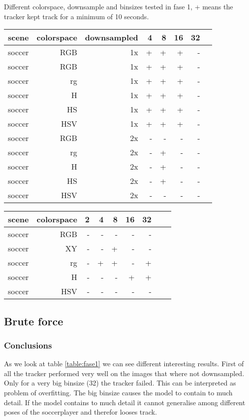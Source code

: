 \documentclass[a4paper,11pt]{article}
\begin{document}
	Different colorspace, downsample and binsizes tested in fase 1, +
	means the tracker kept track for a minimum of 10 seconds. 
	\begin{tabular}{l*{7}{r|}}
		\label{table:fase1}
		scene	& 	colorspace	& downsampled & 4 & 8 & 16 & 32\\
		\hline
		soccer 	& 	RGB	 		& 1x		  			  & + & + & +  &  -\\
		soccer 	& 	RGB	 		& 1x		  			  & + & + & +  &  -\\
		soccer 	& 	rg	 		& 1x 		  			  & + & + & +  &  -\\
		soccer 	& 	H	 		& 1x		 			  & + & + & +  &  -\\
		soccer 	& 	HS	 		& 1x		  			  & + & + & +  &  -\\
		soccer 	& 	HSV	 		& 1x		  			  & + & + & +  &  -\\
		soccer 	& 	RGB	 		& 2x		  			  & - & - & -  &  -\\
		soccer 	& 	rg	 		& 2x 		  			  & - & + & -  &  -\\
		soccer 	& 	H	 		& 2x		  			  & - & + & -  &  -\\
		soccer 	& 	HS	 		& 2x		  			  & - & + & -  &  -\\
		soccer 	& 	HSV	 		& 2x		  			  & - & - & -  &  -\\

	\end{tabular}	

	\begin{tabular}{l*{8}{r|}}
		scene	& 	colorspace	&  2 & 4 & 8 & 16 & 32\\
		\hline
		soccer 	& 	RGB	 		&  - & - & - & - & -\\
		soccer 	& 	XY	 		&  - & - & + & - & -\\
		soccer 	& 	rg	 		&  - & + & + & - & +\\
		soccer 	& 	H	 		&  - & - & - & + & +\\
		soccer 	& 	HSV	 		&  - & - & - & - & -\\ 
	\end{tabular}	

	\subsection{Brute force} 
\subsubsection{Conclusions}
As we look at table \ref{table:fase1} we can see different interesting results.
First of all the tracker performed very well on the images that where not
downsampled. Only for a very big binsize (32) the tracker failed. This can be
interpreted as problem of overfitting. The big binsize causes the model to
contain to much detail. If the model contains to much detail it cannot
generalise among different poses of the soccerplayer and therefor looses track.
\end{document}
